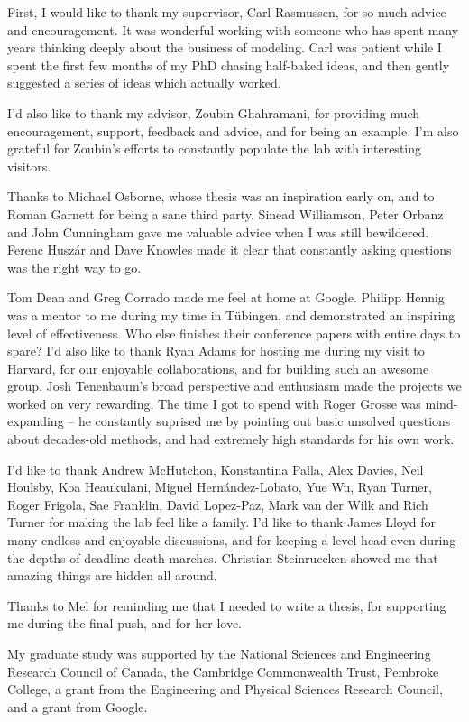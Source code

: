 
\begin{acknowledgements}      


First, I would like to thank my supervisor, Carl Rasmussen, for so much advice and encouragement.
It was wonderful working with someone who has spent many years thinking deeply about the business of modeling.
Carl was patient while I spent the first few months of my PhD chasing half-baked ideas, and then gently suggested a series of ideas which actually worked.

I'd also like to thank my advisor, Zoubin Ghahramani, for providing much encouragement, support, feedback and advice, and for being an example.
I'm also grateful for Zoubin's efforts to constantly populate the lab with interesting visitors.

Thanks to Michael Osborne, whose thesis was an inspiration early on, and to Roman Garnett for being a sane third party.
Sinead Williamson, Peter Orbanz and John Cunningham gave me valuable advice when I was still bewildered.
Ferenc Husz\'ar and Dave Knowles made it clear that constantly asking questions was the right way to go.

Tom Dean and Greg Corrado made me feel at home at Google.
Philipp Hennig was a mentor to me during my time in T\"{u}bingen, and demonstrated an inspiring level of effectiveness.
Who else finishes their conference papers with entire days to spare?
I'd also like to thank Ryan Adams for hosting me during my visit to Harvard, for our enjoyable collaborations, and for building such an awesome group.
Josh Tenenbaum's broad perspective and enthusiasm made the projects we worked on very rewarding.
The time I got to spend with Roger Grosse was mind-expanding -- he constantly suprised me by pointing out basic unsolved questions about decades-old methods, and had extremely high standards for his own work.

I'd like to thank Andrew McHutchon, Konstantina Palla, Alex Davies, Neil Houlsby, Koa Heaukulani, Miguel Hern\'{a}ndez-Lobato, Yue Wu, Ryan Turner, Roger Frigola, Sae Franklin, David Lopez-Paz, Mark van der Wilk and Rich Turner for making the lab feel like a family.
I'd like to thank James Lloyd for many endless and enjoyable discussions, and for keeping a level head even during the depths of deadline death-marches.
Christian Steinruecken showed me that amazing things are hidden all around.

Thanks to Mel for reminding me that I needed to write a thesis, for supporting me during the final push, and for her love.

My graduate study was supported by the National Sciences and Engineering Research Council of Canada, the Cambridge Commonwealth Trust, Pembroke College, a grant from the Engineering and Physical Sciences Research Council, and a grant from Google.

\end{acknowledgements}
